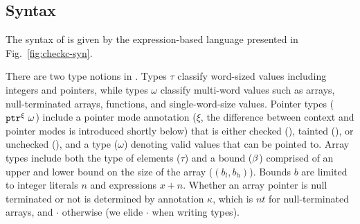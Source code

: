 \subsection{Syntax}\label{sec:syntax}

The syntax of \lang is given by the expression-based
language presented in Fig.~\ref{fig:checkc-syn}.

There are two type notions in \lang.  Types $\tau$ classify
word-sized values including integers and pointers, while types
$\omega$ classify multi-word values such as arrays, null-terminated
arrays, functions, and single-word-size values. 
%
Pointer types ($\mathtt{ptr}^{\xi}~{\omega}$) include a pointer mode annotation 
($\xi$, the difference between context and pointer modes is introduced shortly below)
that is either checked (\cmode), tainted (\tmode), or unchecked (\umode),
and a type ($\omega$) denoting valid values that can be pointed to.
Array types include both the type of
elements ($\tau$) and a bound ($\beta$) comprised of an upper and
lower bound on the size of the array ($(b_l,b_h)$). Bounds $b$ are
limited to integer literals $n$ and expressions $x + n$.
Whether an array pointer is null terminated or not is determined by annotation
$\kappa$, which is $nt$ for null-terminated arrays, and $\cdot$
otherwise (we elide $\cdot$ when writing types).
% 



